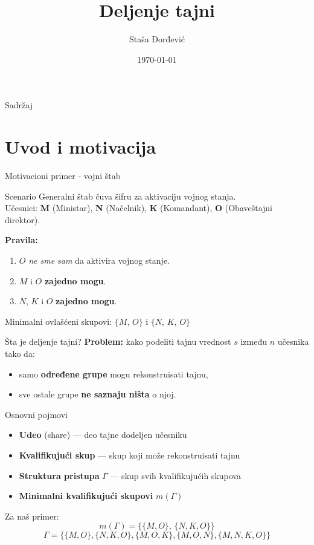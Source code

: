 \documentclass[aspectratio=1610]{beamer}
\title{Deljenje tajni}
\author{Staša Đorđević}
\date{\today}
\begin{document}
\begin{frame}
\titlepage
\end{frame}
\begin{frame}{Sadržaj}
\tableofcontents
\end{frame}
 
\section{Uvod i motivacija}
 
\begin{frame}{Motivacioni primer - vojni štab}
\begin{block}{Scenario}
Generalni štab čuva šifru za aktivaciju vojnog stanja.\\[0.4em]
Učesnici: \textbf{M} (Ministar), \textbf{N} (Načelnik),
\textbf{K} (Komandant), \textbf{O} (Obaveštajni direktor).
\end{block}
 
\vspace{0.6em}
\textbf{Pravila:}
\begin{enumerate}
\item $O$ \emph{ne sme sam} da aktivira vojnog stanje.
\item $M$ i $O$ \textbf{zajedno mogu}.
\item $N$, $K$ i $O$ \textbf{zajedno mogu}.
\end{enumerate}
 
\vspace{0.8em}
\centering
\large
Minimalni ovlašćeni skupovi: \quad
$\{M,\,O\}$ \quad i \quad $\{N,\,K,\,O\}$
\end{frame}

\begin{frame}{Šta je deljenje tajni?}
\textbf{Problem:} kako podeliti tajnu vrednost $s$ između $n$ učesnika tako da:
\begin{itemize}
\item samo \textbf{određene grupe} mogu rekonstruisati tajnu,
\item sve ostale grupe \textbf{ne saznaju ništa} o njoj.
\end{itemize}
 
\end{frame}
 
\begin{frame}{Osnovni pojmovi}
\begin{itemize}
\item \textbf{Udeo} (share) --- deo tajne dodeljen učesniku
\item \textbf{Kvalifikujući skup} --- skup koji može rekonstruisati tajnu
\item \textbf{Struktura pristupa} $\Gamma$ --- skup svih kvalifikujućih skupova
\item \textbf{Minimalni kvalifikujući skupovi} $m(\Gamma)$
\end{itemize}
 
\vspace{1em}
Za naš primer:
\[m(\Gamma) = \bigl\{\{M,O\},\, \{N,K,O\}\bigr\}\]
\[\Gamma = \bigl\{\{M,O\}, \{N,K,O\}, \{M,O,K\}, \{M,O,N\}, \{M,N,K,O\}\bigr\}\]
\end{frame}
\end{document}
